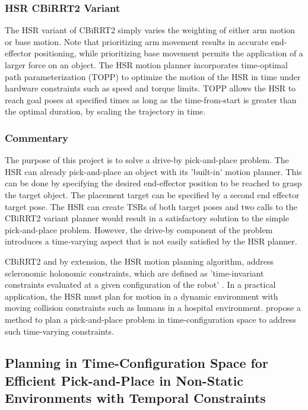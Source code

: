 \documentclass[11pt]{article}
\begin{document}
        \subsubsection{HSR CBiRRT2 Variant}
            The HSR variant of CBiRRT2 simply varies the weighting of either arm motion or base motion. \cite{yamamoto_development_2019} Note that prioritizing arm movement results in accurate end-effector positioning, while prioritizing base movement permits the application of a larger force on an object. The HSR motion planner incorporates time-optimal path parameterization (TOPP)\cite{yamamoto_development_2019} to optimize the motion of the HSR in time under hardware constraints such as speed and torque limits. TOPP allows the HSR to reach goal poses at specified times as long as the time-from-start is greater than the optimal duration, by scaling the trajectory in time.

        \subsubsection{Commentary}
            The purpose of this project is to solve a drive-by pick-and-place problem. The HSR can already pick-and-place an object with its 'built-in' motion planner. This can be done by specifying the desired end-effector position to be reached to grasp the target object. The placement target can be specified by a second end effector target pose. The HSR can create TSRs of both target poses and two calls to the CBiRRT2 variant planner would result in a satisfactory solution to the simple pick-and-place problem. However, the drive-by component of the problem introduces a time-varying aspect that is not easily satisfied by the HSR planner.

            \par CBiRRT2 and by extension, the HSR motion planning algorithm, address scleronomic holonomic constraints, which are defined as 'time-invariant constraints evaluated at a given configuration of the robot' \cite{berenson_pose-constrained_2009}. In a practical application, the HSR must plan for motion in a dynamic environment with moving collision constraints such as humans in a hospital environment. \cite{yang_planning_2018} propose a method to plan a pick-and-place problem in time-configuration space to address such time-varying constraints.

    \subsection{Planning in Time-Configuration Space for Efficient Pick-and-Place in Non-Static Environments with Temporal Constraints}
\end{document}
